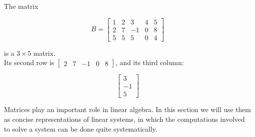 \begin{ex}
\label{Ex:LinSystems:FirstMatrix}
The matrix  

$$
B = \left[
  \begin{array}{ccccc}
        1 & 2 & 3 & 4 & 5 \\
        2 & 7 & -1 & 0 & 8 \\
        5 & 5 & 5 & 0 & 4
    \end{array}\right]
$$

is a $3\times 5$ matrix.\\
Its second row is $
\begin{bmatrix} 2 & 7 & -1 & 0 & 8  \end{bmatrix}$, 
and its third column: 

$$
\left[
  \begin{array}{c} 3 \\ -1 \\ 5   \end{array}\right]
$$

\end{ex}

Matrices play an important role in linear algebra. In this section we will use them as  concise representations of  linear systems,  in which
the computations involved to solve a system can be done quite systematically.

